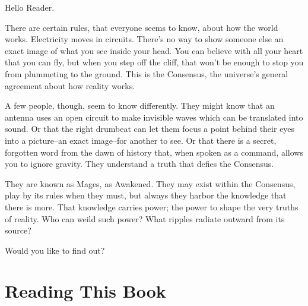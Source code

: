 \documentclass[
  oneside,
  statementpaper,
  9pt]{memoir}
\begin{document}
\begin{Narrator}

Hello Reader.

There are certain rules, that everyone seems to know, about how the world works. Electricity moves in circuits. There’s no way to show someone else an exact image of what you see inside your head. You can believe with all your heart that you can fly, but when you step off the cliff, that won't be enough to stop you from plummeting to the ground. This is the Consensus, the universe's general agreement about how reality works.

A few people, though, seem to know differently. They might know that an antenna uses an open circuit to make invisible waves which can be translated into sound. Or that the right drumbeat can let them focus a point behind their eyes into a picture--an exact image--for another to see. Or that there is a secret, forgotten word from the dawn of history that, when spoken as a command, allows you to ignore gravity. They understand a truth that defies the Consensus.

They are known as Mages, as Awakened. They may exist within the Consensus, play by its rules when they must, but always they harbor the knowledge that there is more. That knowledge carries power; the power to shape the very truths of reality. Who can weild such power? What ripples radiate outward from its source?

Would you like to find out?

\end{Narrator}

\hypertarget{reading-this-book}{%
\section{Reading This Book}\label{reading-this-book}}
\end{document}

